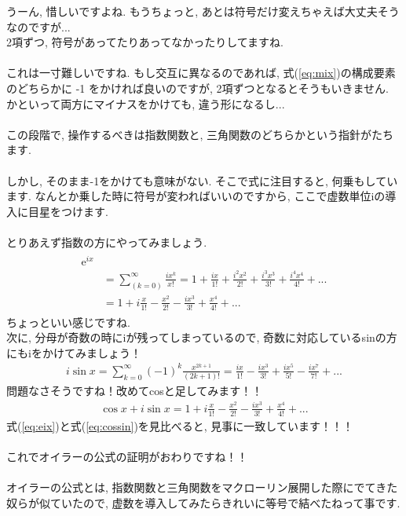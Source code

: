 \documentclass[11pt,a4paper]{jsarticle}
\begin{document}
うーん, 惜しいですよね. もうちょっと, あとは符号だけ変えちゃえば大丈夫そうなのですが...\\
2項ずつ, 符号があってたりあってなかったりしてますね.\\
\\
これは一寸難しいですね. もし交互に異なるのであれば, 式(\ref{eq:mix})の構成要素のどちらかに -1 をかければ良いのですが, 2項ずつとなるとそうもいきません. かといって両方にマイナスをかけても, 違う形になるし...\\
\\
この段階で, 操作するべきは指数関数と, 三角関数のどちらかという指針がたちます.\\
\\
しかし, そのまま-1をかけても意味がない. そこで式に注目すると, 何乗もしています. なんとか乗した時に符号が変わればいいのですから, ここで虚数単位iの導入に目星をつけます.\\
\\
とりあえず指数の方にやってみましょう.
\begin{eqnarray}
\begin{split}
\mathrm{e}^{ix} \\
& = \sum_{(k=0)}^\infty \frac{ix^k}{x!} = 1 + \frac{ix}{1!} + \frac{i^2x^2}{2!} + \frac{i^3x^3}{3!} + \frac{i^4x^4}{4!} + ...\\
& = 1 + i\frac{x}{1!} - \frac{x^2}{2!} - \frac{ix^3}{3!} + \frac{x^4}{4!} + ...
\label{eq:eix}
\end{split}
\end{eqnarray}
ちょっといい感じですね.\\
次に, 分母が奇数の時にiが残ってしまっているので, 奇数に対応しているsinの方にもiをかけてみましょう！\\
\begin{eqnarray}
i\sin x = \sum_{k=0}^{\infty}(-1)^k \frac{x^{2k + 1}}{(2k + 1)!} = \frac{ix}{1!} - \frac{ix^3}{3!} + \frac{ix^5}{5!} - \frac{ix^7}{7!} +  ...
\end{eqnarray}
問題なさそうですね！改めてcosと足してみます！！\\
\begin{eqnarray}
\cos x + i\sin x = 1 + i\frac{x}{1!} - \frac{x^2}{2!} - \frac{ix^3}{3!} + \frac{x^4}{4!} + ...
\label{eq:cossin}
\end{eqnarray}
式(\ref{eq:eix})と式(\ref{eq:cossin})を見比べると, 見事に一致しています！！！\\
\\
これでオイラーの公式の証明がおわりですね！！\\
\\
オイラーの公式とは, 指数関数と三角関数をマクローリン展開した際にでてきた奴らが似ていたので, 虚数を導入してみたらきれいに等号で結べたねって事です.\\
\end{document}
